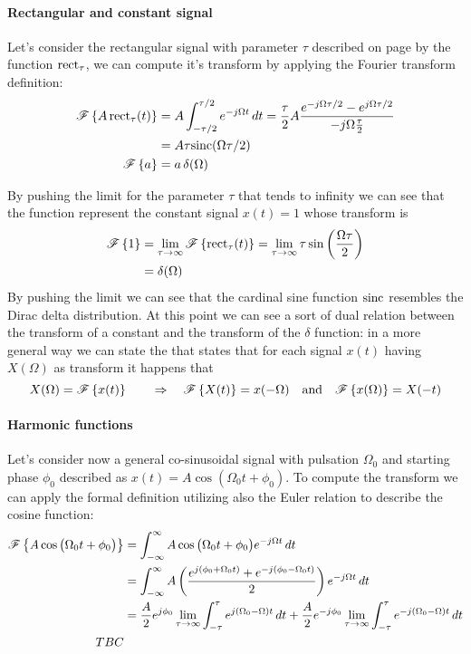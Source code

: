 	\paragraph{Rectangular and constant signal} Let's consider the rectangular signal with parameter $\tau$ described on page \pageref{eq:intro:rect} by the function $\textrm{rect}_\tau$, we can compute it's transform by applying the Fourier transform definition:
	\begin{align*}
			\mathscr{F}\left\{ A \, \textrm{rect}_\tau(t) \right\}	& =	 A \int_{-\tau/2}^{\tau/2} e ^{-j\Omega t} \, dt = \frac \tau 2 A \frac{e^{-j\Omega \tau/2} - e^{j\Omega \tau/2}}{-j\Omega \frac \tau 2} \\ & = A \tau \textrm{sinc} (\Omega \tau/2) \\
			\mathscr{F}\left\{ a \right\} & = a \, \delta(\Omega)
	\end{align*}
	
	By pushing the limit for the parameter $\tau$ that tends to infinity we can see that the function represent the constant signal $x(t) = 1$ whose transform is
	\begin{align*}
		\mathscr{F}\left\{ 1 \right\} & = \lim_{\tau\rightarrow \infty} \mathscr{F}\left\{ \textrm{rect}_\tau(t) \right\} = \lim_{\tau\rightarrow \infty} \tau \sin\left(   \frac{\Omega \tau}{2}\right) \\ & = \delta(\Omega)
	\end{align*}
	By pushing the limit we can see that the cardinal sine function $\textrm{sinc}$ resembles the Dirac delta distribution. At this point we can see a sort of dual relation between the transform of a constant and the transform of the $\delta$ function: in a more general way we can state the  that states that for each signal $x(t)$ having $X(\Omega)$ as transform it happens that
	\begin{equation}
		X(\Omega) = \mathscr{F}\left\{ x(t) \right\} \qquad \Rightarrow \quad \mathscr{F}\left\{ X(t) \right\} = x(-\Omega) \quad \textrm{and} \quad \mathscr{F}\left\{ x(\Omega) \right\} = X(-t)
	\end{equation}
	
	\paragraph{Harmonic functions} Let's consider now a general co-sinusoidal signal with pulsation $\Omega_0$ and starting phase $\phi_0$ described as $x(t) = A\cos(\Omega_0 t + \phi_0)$. To compute the transform we can apply the formal definition utilizing also the Euler relation to describe the cosine function:
	\begin{align*}
		\mathscr{F}\left\{ A \cos\big(\Omega_0 t + \phi_0\big) \right\} & = \int_{-\infty}^\infty A  \cos\big(\Omega_0 t + \phi_0\big) e^{-j\Omega t} \, dt \\ 
		& = \int_{-\infty}^\infty A \left( \frac{e^{j(\phi_0 + \Omega_0 t)} + e^{-j(\phi_0 - \Omega_0t)} }{2} \right) e^{-j\Omega t}\, dt \\
		& = \frac A 2 e^{j\phi_0} \lim_{\tau\rightarrow\infty} \int_{-\tau}^\tau e^{j(\Omega_0-\Omega)t}\, dt + \frac A 2 e^{-j\phi_0} \lim_{\tau\rightarrow\infty} \int_{-\tau}^\tau e^{-j(\Omega_0-\Omega)t}\, dt \\
		TBC
	\end{align*}
	
	
	
	